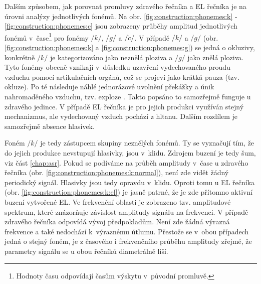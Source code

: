 Dalším způsobem, jak porovnat promluvy zdravého řečníka  a EL řečníka je na úrovni analýzy jednotlivých fonémů.
Na obr. \ref{fig:construction:phonemes:k} - \ref{fig:construction:phonemes:c} jsou zobrazeny průběhy amplitud jednotlivých fonémů v~čase\footnote{Hodnoty času odpovídají časům výskytu v~původní promluvě.} pro fonémy $/k/$, $/g/$ a $/\check{c}/$.
V případě $/k/$ a $/g/$ (obr. \ref{fig:construction:phonemes:k} a \ref{fig:construction:phonemes:g}) se jedná o okluzivy, konkrétně $/k/$ je kategorizováno jako neznělá ploziva a $/g/$ jako znělá ploziva.
Tyto fonémy obecně vznikají v~důsledku uzavření vydechovaného proudu vzduchu pomocí artikulačních orgánů, což se projeví jako krátká pauza (tzv. okluze).
Po té následuje náhlé jednorázové uvolnění překážky a únik nahromaděného vzduchu, tzv. exploze \cite{Psutka2006}.
Takto popsáno to samozřejmě funguje u zdravého jedince.
V případě EL řečníka je pro jejich produkci využíván stejný mechanizmus, ale vydechovaný vzduch pochází z hltanu.
Dalším rozdílem je samozřejmě absence hlasivek.

Foném $/k/$ je tedy zástupcem skupiny neznělých fonémů.
Ty se vyznačují tím, že do jejich produkce nevstupují hlasivky, jsou v~klidu.
Zdrojem buzení je tedy šum, viz část \ref{chap:asr}.
Pokud se podíváme na průběh amplitudy v~čase u zdravého řečníka (obr. \ref{fig:construction:phonemes:k:normal}), není zde vidět žádný periodický signál.
Hlasivky jsou tedy opravdu v~klidu.
Oproti tomu u EL řečníka (obr. \ref{fig:construction:phonemes:k:el}) je jasně patrné, že je zde přítomno aktivní buzení vytvořené EL.
Ve frekvenční oblasti je zobrazeno tzv. amplitudové spektrum, které znázorňuje závislost amplitudy signálu na frekvenci.
V případě zdravého řečníka odpovídá vývoj předpokladům.
Není zde žádná výrazná frekvence a také nedochází k~výraznému útlumu.
Přestože se v~obou případech jedná o stejný foném, je z časového i frekvenčního průběhu amplitudy zřejmé, že parametry signálu se u obou řečníků diametrálně liší.

